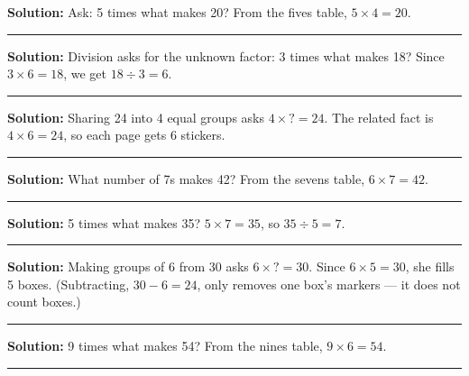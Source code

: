 \documentclass[12pt]{article}
\begin{document}



\textbf{Solution:} Ask: 5 times what makes 20? From the fives table, $5 \times 4 = 20$. 

\noindent\rule{\linewidth}{0.2pt}


\textbf{Solution:} Division asks for the unknown factor: 3 times what makes 18? Since $3 \times 6 = 18$, we get $18 \div 3 = 6$. 

\noindent\rule{\linewidth}{0.2pt}


\textbf{Solution:} Sharing 24 into 4 equal groups asks $4 \times \textbf{?} = 24$. The related fact is $4 \times 6 = 24$, so each page gets 6 stickers. 

\noindent\rule{\linewidth}{0.2pt}


\textbf{Solution:} What number of 7s makes 42? From the sevens table, $6 \times 7 = 42$. 

\noindent\rule{\linewidth}{0.2pt}


\textbf{Solution:} 5 times what makes 35? $5 \times 7 = 35$, so $35 \div 5 = 7$. 

\noindent\rule{\linewidth}{0.2pt}


\textbf{Solution:} Making groups of 6 from 30 asks $6 \times \textbf{?} = 30$. Since $6 \times 5 = 30$, she fills 5 boxes. (Subtracting, $30 - 6 = 24$, only removes one box's markers --- it does not count boxes.) 

\noindent\rule{\linewidth}{0.2pt}


\textbf{Solution:} 9 times what makes 54? From the nines table, $9 \times 6 = 54$. 

\noindent\rule{\linewidth}{0.2pt}

\end{document}

